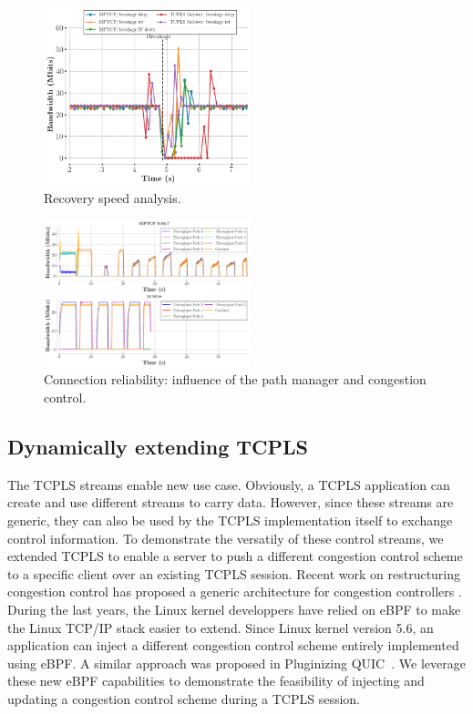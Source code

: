 \begin{figure}[!t]
  \begin{center}
    \includegraphics[width=6cm]{figures/breakage_analysis.png}
  \end{center}
  \caption{Recovery speed analysis.}
\end{figure}


\begin{figure}[!t]
  \begin{center}
    \includegraphics[width=6cm]{figures/tcpls_mptcp.png}
  \end{center}
  \caption{Connection reliability: influence of the path manager and congestion
  control.}
\end{figure}



\subsection{Dynamically extending TCPLS}
The TCPLS streams enable new use case. Obviously, a TCPLS application can
create and use different streams to carry data. However, since these streams
are generic, they can also be used by the TCPLS implementation itself to
exchange control information. To demonstrate the versatily of these control
streams, we extended TCPLS to enable a server to push a different congestion
control scheme to a specific client over an existing TCPLS session. Recent
work on restructuring congestion control has proposed a generic architecture
for congestion controllers \cite{narayan2018restructuring}. 
During the last years, the Linux kernel developpers have relied on eBPF
to make the Linux TCP/IP stack \cite{brakmo2017tcp,tran2020beyond} easier
to extend. Since Linux kernel version 5.6, an application can inject
a different congestion control scheme entirely implemented using eBPF. A similar approach was proposed in Pluginizing QUIC~\cite{de2019pluginizing}.
We leverage these new eBPF capabilities to
demonstrate the feasibility of injecting and
updating a congestion control scheme during a TCPLS session.

